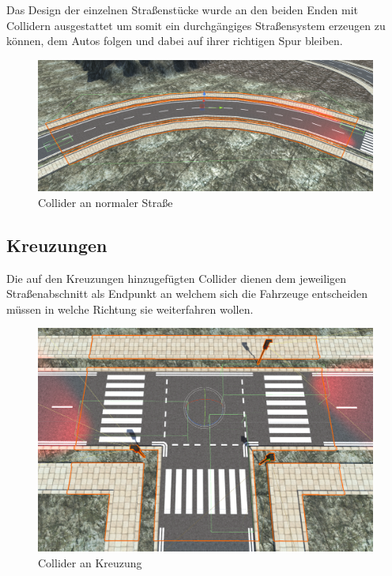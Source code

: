 Das Design der einzelnen Straßenstücke wurde an den beiden Enden mit Collidern ausgestattet um somit ein durchgängiges Straßensystem erzeugen zu können, dem Autos folgen und dabei auf ihrer richtigen Spur bleiben.

\begin{figure}[H]
\begin{center}
	\includegraphics[width=1\textwidth]{BilderAllgemein/street_collider.png}
\end{center}
	\caption{Collider an normaler Straße}
	\label{img:street_collider}
\end{figure}

\subsection{Kreuzungen}

Die auf den Kreuzungen hinzugefügten Collider dienen dem jeweiligen Straßenabschnitt als Endpunkt an welchem sich die Fahrzeuge entscheiden müssen in welche Richtung sie weiterfahren wollen.

\begin{figure}[H]
\begin{center}
	\includegraphics[width=1\textwidth]{BilderAllgemein/crossing_collider.png}
\end{center}
	\caption{Collider an Kreuzung}
	\label{img:crossing_collider}
\end{figure}

